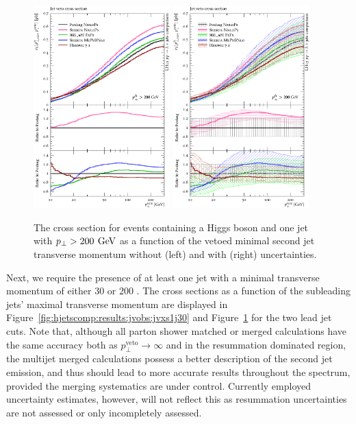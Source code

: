 \begin{figure}[t!]
  \centering
  \includegraphics[width=0.47\textwidth]{figures/hjetscomp_u_xs_jet_veto_j1_200.pdf}
  \hfill
  \includegraphics[width=0.47\textwidth]{figures/hjetscomp_xs_jet_veto_j1_200.pdf}
  \caption{
    The cross section for events containing a Higgs boson 
    and one jet with $p_\perp>200\,\text{\:GeV}$ as a function of
    the vetoed minimal second jet transverse momentum without
    (left) and with (right) uncertainties.
    \label{fig:hjetscomp:results:jvobs:jvxs1j200}
  }
\end{figure}

Next, we require the presence of at least one jet with 
a minimal transverse momentum of either $30$ or $200$ \gev. 
The cross sections as a function of 
the subleading jets' maximal transverse momentum are displayed in 
Figure~\ref{fig:hjetscomp:results:jvobs:jvxs1j30} and 
Figure~\ref{fig:hjetscomp:results:jvobs:jvxs1j200} for the two lead jet cuts. 
Note that, although all parton 
shower matched or merged calculations have the same accuracy both as 
$p_\perp^\text{veto}\to\infty$ and in the resummation dominated region, 
the multijet merged calculations possess a better description of the 
second jet emission, and thus should lead to more accurate results 
throughout the spectrum, provided the merging systematics are under control. 
Currently employed uncertainty estimates, however, will not reflect this 
as resummation uncertainties are not assessed or only incompletely assessed.


